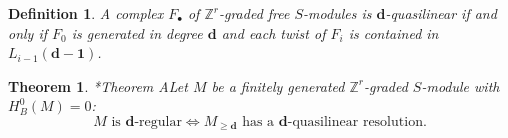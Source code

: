 \documentclass[11pt,reqno]{amsart}
\newtheorem{theorem}[lemma]{Theorem}
\newtheorem{defn}[lemma]{Definition}
\theoremstyle{remark}
\newcommand{\dd}{\mathbf d}
\newcommand{\one}{\mathbf 1}
\newcommand{\K}{\mathbb{K}}
\renewcommand{\P}{\mathbb{P}}
\newcommand{\Z}{\mathbb{Z}}
\begin{document}
\begin{defn}
A complex $F_{\bullet}$ of $\Z^{r}$-graded free $S$-modules is $\dd$-quasilinear if and only if $F_{0}$ is generated in degree $\dd$ and each twist of $F_{i}$ is contained in $L_{i-1}(\dd-\one)$.
\end{defn}

%

\begin{theorem}\cite{bruceHellerSayrafi21}*{Theorem A}\label{thm:mgreg-main}
Let $M$ be a finitely generated $\Z^{r}$-graded $S$-module with $H^{0}_{B}(M)=0$:
\[
\text{$M$ is $\dd$-regular} \iff  \text{$M_{\geq\dd}$ has a $\dd$-quasilinear resolution}.
\]
\end{theorem}
\end{document}
